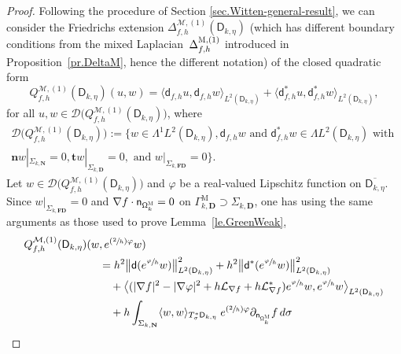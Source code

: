 \documentclass[JEP,XML,SOM,Unicode,NoEqCountersInSection,NoFloatCountersInSection,published]{cedram}
\newcommand{\Psfrac}[2]{(\sfrac{#1}{#2})}
\newcommand{\mbf}[1]{\mathbf{#1}}
\theoremstyle{plain}
\theoremstyle{definition}
\begin{document}
\begin{proof}
Following the procedure of Section \ref{sec.Witten-general-result}, we
can consider the Friedrichs extension $\Delta_{f,h}^{
\mathcal M,(1)} (\mathsf D_{k,\eta})$ (which has different
boundary conditions from the mixed Laplacian~$\Delta_{f,h}^{
\textsc{M},(1)}$ introduced in Proposition~\ref{pr.DeltaM}, hence
the different notation) of the closed quadratic form\vspace*{-3pt}
\[
Q_{f,h}^{ \mathcal M,(1)} (\mathsf D_{k,\eta})(u,w)=\langle \mathsf d_{f,h} u,\mathsf d_{f,h}w \rangle_{L^2(\mathsf D_{k,\eta})} +\langle \mathsf d^*_{f,h}u,\mathsf d^*_{f,h}w \rangle_{L^2(\mathsf D_{k,\eta})},
\]
for all $u,w\in\mathcal D\bigl(Q_{f,h}^{ \mathcal M,(1)} (\mathsf D_{k,\eta})\bigr)$, where\vspace*{-5pt}
\begin{multline*}
\mathcal D\bigl(Q_{f,h}^{ \mathcal M,(1)} (\mathsf D_{k,\eta})\bigr):=\big \{w\in \Lambda^1L^2(\mathsf D_{k,\eta}), \mathsf d_{f,h}w \text{ and } \mathsf d^*_{f,h} w\in \Lambda L^2(\mathsf D_{k,\eta}) \text{ with }\\
\mathbf n w|_{\Sigma_{k,\mbf N} }=0, \mathbf t w|_{\Sigma_{k,\mbf D} }=0, \text{ and } 
w|_{\Sigma_{k,\mbf{FD}} }=0 \big\}.
\end{multline*}
Let $w\in \mathcal D\bigl(Q_{f,h}^{ \mathcal M,(1)} (\mathsf D_{k,\eta})\bigr)$ and $\varphi$ be a real-valued Lipschitz
function on $\overline{\mathsf D_{k,\eta}}$.
Since $w|_{\Sigma_{k,\mbf{FD}} }=0 $ and $\nabla f \cdot \mathsf n_{\mathsf \Omega_k^{\textsc{M}} }=0$ on $\Gamma_{k, \mbf D}^{\text{M}}\supset \Sigma_{k, \mbf D}$, one has using the same arguments as those used to prove Lemma~\ref{le.GreenWeak},
\begin{equation}
\label{eq.Spec2}
\begin{aligned}
Q_{f,h}^{ \mathcal M,(1)} (\mathsf D_{k,\eta})(w&,e^{\Psfrac 2h
\varphi} w)\\
&=
h^{2}\big \| \mathsf d (e^{\sfrac{\varphi}{h}} w)\big \|^{2}_{ L^{2} (\mathsf D_{k,\eta})}+
h^{2} \big \| \mathsf d^{*} (e^{\sfrac{\varphi}{h}} w) \big \|^{2}_{ L^{2} (\mathsf D_{k,\eta})}\\
&\quad + \big \langle
(|\nabla f|^{2}-|\nabla \varphi|^{2}+h\mathcal{L}_{\nabla
f}+h\mathcal{L}_{\nabla
f}^{*})e^{\sfrac{\varphi}{h}} w, e^{\sfrac{\varphi}{h}}
w\big \rangle_{ L^{2} (\mathsf D_{k,\eta})}\\
&\quad +h \int_{\Sigma_{k,\mbf N}}
\langle w,w
\rangle_{ T_{\sigma}^{*} \mathsf D_{k,\eta} }\;e^{\Psfrac{2 }{h}\varphi }\partial_{\mathsf n_{ \mathsf \Omega_k^{\textsc{M}} } }f\, d\sigma\\

\end{aligned}
\end{equation}
\end{proof}
\end{document}
